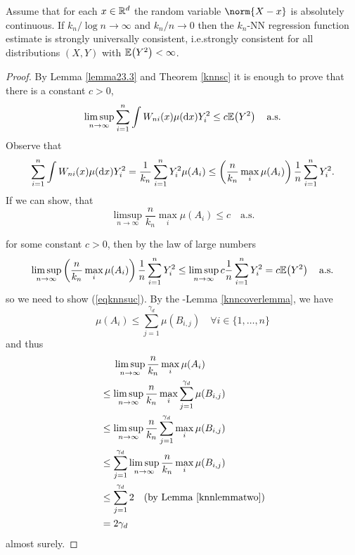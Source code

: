 \begin{theorem} \label{knnsuc}
Assume that for each \(x \in \mathbb{R}^d\) the random variable \(\norm{X - x}\) is absolutely continuous. If \(k_n / \log n \to \infty\) and \(k_n / n \to 0\) then the \(k_n\)-NN regression function estimate is strongly universally consistent, i.e.\@ strongly consistent for all distributions \((X, Y)\) with \(\mathbb{E}\!\left(Y^2\right) < \infty\).
\end{theorem}

\begin{proof}
    By Lemma \ref{lemma23.3} and Theorem \ref{knnsc} it is enough to prove that there is a constant \(c > 0\),
    \[
        \limsup_{n \to \infty} \sum_{i = 1}^n \int W_{ni}(x) \mu(\dx) Y_i^2 \leq c \ev{Y^2} \quad \text{a.s.}
    \]
    Observe that
    \[
        \sum_{i = 1}^n \int W_{ni}(x) \mu(\dx) Y_i^2 = \frac{1}{k_n} \sum_{i=1}^n Y_i^2 \mu(A_i) \leq \left( \frac{n}{k_n} \max_i \mu(A_i) \right) \frac{1}{n} \sum_{i = 1}^n Y_i^2.
    \]
    If we can show, that
    \begin{equation} \label{eqknnsuc}
        \limsup_{n \to \infty} \frac{n}{k_n} \max_i \mu(A_i) \leq c \quad \text{a.s.}
    \end{equation}

    for some constant \(c > 0\), then by the law of large numbers
    \begin{align*}
        \limsup_{n \to \infty} \left( \frac{n}{k_n} \max_i \mu(A_i) \right) \frac{1}{n} \sum_{i = 1}^n Y_i^2 \leq \limsup_{n \to \infty} c \frac{1}{n} \sum_{i = 1}^n Y_i^2 = c \ev{Y^2} \quad \text{a.s.}
    \end{align*}
    so we need to show (\ref{eqknnsuc}). By the -Lemma \ref{knncoverlemma}, we have
    \[
        \mu(A_i) \leq \sum_{j=1}^{\gamma_d}\mu(B_{i,j}) \quad \forall i \in \{1, \ldots, n\} 
    \]
    and thus
    \begin{align*}
        &\quad \ \limsup_{n \to \infty} \frac{n}{k_n} \max_i \mu(A_i) \\
        &\leq \limsup_{n \to \infty} \frac{n}{k_n} \max_i \sum_{j=1}^{\gamma_d}\mu(B_{i,j}) \\
        &\leq \limsup_{n \to \infty} \frac{n}{k_n} \sum_{j=1}^{\gamma_d} \max_i \mu(B_{i,j}) \\ 
        &\leq \sum_{j=1}^{\gamma_d} \limsup_{n \to \infty} \frac{n}{k_n}  \max_i \mu(B_{i,j}) \\
        &\leq \sum_{j=1}^{\gamma_d} 2 \quad \text{(by Lemma \ref{knnlemmatwo})} \\
        &= 2 \gamma_d
    \end{align*}
    almost surely.
    
\end{proof}
\newpage


